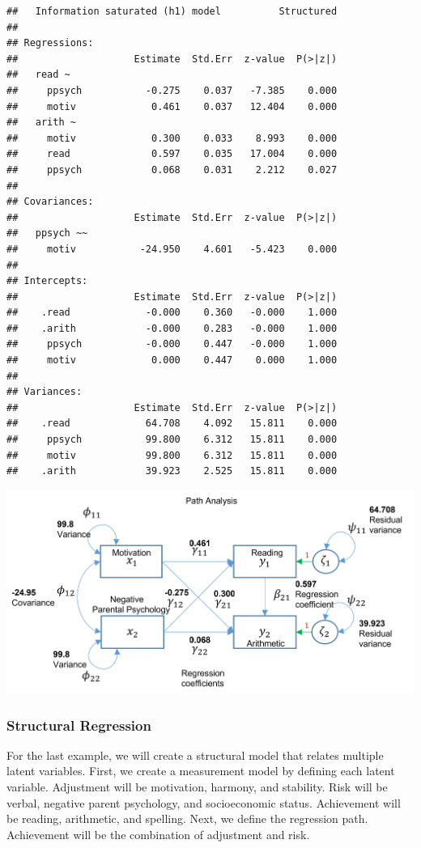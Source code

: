 \documentclass[
]{article}
\begin{document}
\begin{verbatim}
##   Information saturated (h1) model          Structured
## 
## Regressions:
##                    Estimate  Std.Err  z-value  P(>|z|)
##   read ~                                              
##     ppsych           -0.275    0.037   -7.385    0.000
##     motiv             0.461    0.037   12.404    0.000
##   arith ~                                             
##     motiv             0.300    0.033    8.993    0.000
##     read              0.597    0.035   17.004    0.000
##     ppsych            0.068    0.031    2.212    0.027
## 
## Covariances:
##                    Estimate  Std.Err  z-value  P(>|z|)
##   ppsych ~~                                           
##     motiv           -24.950    4.601   -5.423    0.000
## 
## Intercepts:
##                    Estimate  Std.Err  z-value  P(>|z|)
##    .read             -0.000    0.360   -0.000    1.000
##    .arith            -0.000    0.283   -0.000    1.000
##     ppsych           -0.000    0.447   -0.000    1.000
##     motiv             0.000    0.447    0.000    1.000
## 
## Variances:
##                    Estimate  Std.Err  z-value  P(>|z|)
##    .read             64.708    4.092   15.811    0.000
##     ppsych           99.800    6.312   15.811    0.000
##     motiv            99.800    6.312   15.811    0.000
##    .arith            39.923    2.525   15.811    0.000
\end{verbatim}

\includegraphics{PathAnLablCoef.PNG}

\hypertarget{structural-regression}{%
\subsubsection{Structural Regression}\label{structural-regression}}

For the last example, we will create a structural model that relates
multiple latent variables. First, we create a measurement model by
defining each latent variable. Adjustment will be motivation, harmony,
and stability. Risk will be verbal, negative parent psychology, and
socioeconomic status. Achievement will be reading, arithmetic, and
spelling. Next, we define the regression path. Achievement will be the
combination of adjustment and risk.
\end{document}
